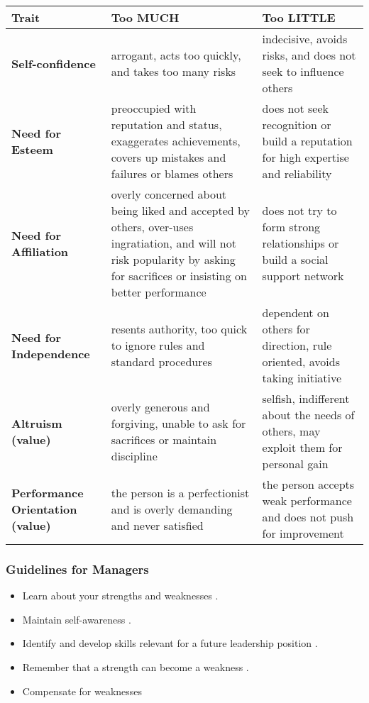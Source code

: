 \begin{center}
\begin{tabular}{ | p{3cm} | p{3cm} | p{3cm}|}
	\\ {\bf Trait } & {\bf Too MUCH} &{\bf  Too LITTLE} \\
	\hline 
	{\bf Self-confidence} & arrogant, acts too quickly, and takes too many risks & indecisive, avoids risks, and does not seek to influence others \\
	\hline
	{\bf Need for Esteem} & preoccupied with reputation and status, exaggerates achievements, covers up mistakes and failures or blames others & does not seek recognition or build a reputation for high expertise and reliability\\
	\hline
	{\bf Need for Affiliation} & overly concerned about being liked and accepted by others, over-uses ingratiation, and will not risk popularity by asking for sacrifices or insisting on better performance & does not try to form strong relationships or build a social support network\\
	\hline
	{\bf Need for Independence} & resents authority, too quick to ignore rules and standard procedures & dependent on others for direction, rule oriented, avoids taking initiative \\
	\hline
	{\bf Altruism (value)} & overly generous and forgiving, unable to ask for sacrifices or maintain discipline & selfish, indifferent about the needs of others, may exploit them for personal gain \\
	\hline
	{\bf Performance Orientation (value)} & the person is a perfectionist and is overly demanding and never satisfied & the person accepts weak performance and does not push for improvement \\
 	\hline
\end{tabular}
\end{center}

\subsubsection{Guidelines for Managers} %
\label{ssub:guidelines_for_managers}

\begin{itemize}
	\item Learn about your strengths and weaknesses .
	\item Maintain self-awareness .
	\item Identify and develop skills relevant for a future leadership position .
	\item Remember that a strength can become a weakness .
	\item Compensate for weaknesses
\end{itemize}

